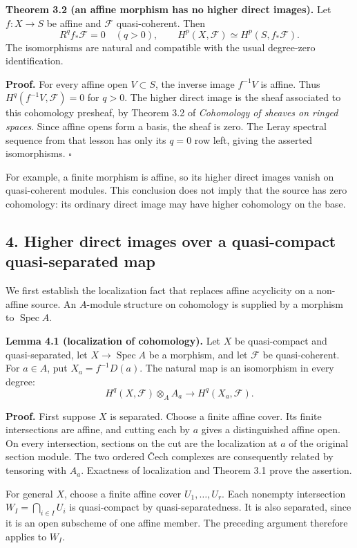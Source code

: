 \documentclass[11pt]{article}
\begin{document}
\textbf{Theorem 3.2 (an affine morphism has no higher direct images).}
Let \(f:X\to S\) be affine and \(\mathcal F\) quasi-coherent. Then \[
R^qf_*\mathcal F=0\quad(q>0),\qquad
H^p(X,\mathcal F)\simeq H^p(S,f_*\mathcal F).
\] The isomorphisms are natural and compatible with the usual
degree-zero identification.

\textbf{Proof.} For every affine open \(V\subset S\), the inverse image
\(f^{-1}V\) is affine. Thus \(H^q(f^{-1}V,\mathcal F)=0\) for \(q>0\).
The higher direct image is the sheaf associated to this cohomology
presheaf, by Theorem 3.2 of \emph{Cohomology of sheaves on ringed
spaces}. Since affine opens form a basis, the sheaf is zero. The Leray
spectral sequence from that lesson has only its \(q=0\) row left, giving
the asserted isomorphisms. \(\square\)

For example, a finite morphism is affine, so its higher direct images
vanish on quasi-coherent modules. This conclusion does not imply that
the source has zero cohomology: its ordinary direct image may have
higher cohomology on the base.

\subsection{4. Higher direct images over a quasi-compact quasi-separated
map}\label{higher-direct-images-over-a-quasi-compact-quasi-separated-map}

We first establish the localization fact that replaces affine acyclicity
on a non-affine source. An \(A\)-module structure on cohomology is
supplied by a morphism to \(\operatorname{Spec}A\).

\textbf{Lemma 4.1 (localization of cohomology).} Let \(X\) be
quasi-compact and quasi-separated, let \(X\to\operatorname{Spec}A\) be a
morphism, and let \(\mathcal F\) be quasi-coherent. For \(a\in A\), put
\(X_a=f^{-1}D(a)\). The natural map is an isomorphism in every degree:
\[
H^q(X,\mathcal F)\otimes_A A_a
\longrightarrow H^q(X_a,\mathcal F).
\]

\textbf{Proof.} First suppose \(X\) is separated. Choose a finite affine
cover. Its finite intersections are affine, and cutting each by \(a\)
gives a distinguished affine open. On every intersection, sections on
the cut are the localization at \(a\) of the original section module.
The two ordered Čech complexes are consequently related by tensoring
with \(A_a\). Exactness of localization and Theorem 3.1 prove the
assertion.

For general \(X\), choose a finite affine cover \(U_1,\ldots,U_r\). Each
nonempty intersection \(W_I=\bigcap_{i\in I}U_i\) is quasi-compact by
quasi-separatedness. It is also separated, since it is an open subscheme
of one affine member. The preceding argument therefore applies to
\(W_I\).
\end{document}
